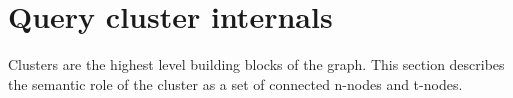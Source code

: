 \section{Query cluster internals}
\label{sec:cluster_internals}

Clusters are the highest level building blocks of the graph. This
section describes the semantic role of the cluster as a set of
connected n-nodes and t-nodes.


